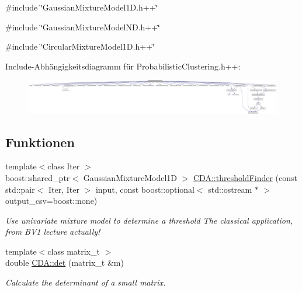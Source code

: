{\ttfamily \#include \char`\"{}GaussianMixtureModel1D.h++\char`\"{}}\par
{\ttfamily \#include \char`\"{}GaussianMixtureModelND.h++\char`\"{}}\par
{\ttfamily \#include \char`\"{}CircularMixtureModel1D.h++\char`\"{}}\par
Include-\/Abhängigkeitsdiagramm für ProbabilisticClustering.h++:\nopagebreak
\begin{figure}[H]
\begin{center}
\leavevmode
\includegraphics[width=420pt]{ProbabilisticClustering_8h_09_09__incl}
\end{center}
\end{figure}
\subsection*{Funktionen}
\begin{DoxyCompactItemize}
\item 
\hypertarget{namespaceCDA_a9e95468a6824e9e9ad95d61d47105664}{
{\footnotesize template$<$class Iter $>$ }\\boost::shared\_\-ptr$<$ GaussianMixtureModel1D $>$ \hyperlink{namespaceCDA_a9e95468a6824e9e9ad95d61d47105664}{CDA::thresholdFinder} (const std::pair$<$ Iter, Iter $>$ input, const boost::optional$<$ std::ostream $\ast$ $>$ output\_\-csv=boost::none)}
\label{namespaceCDA_a9e95468a6824e9e9ad95d61d47105664}

\begin{DoxyCompactList}\small\item\em Use univariate mixture model to determine a threshold The classical application, from BV1 lecture actually! \item\end{DoxyCompactList}\item 
\hypertarget{namespaceCDA_a5ef8a67c215c1b5d7b23192c5336b536}{
{\footnotesize template$<$class matrix\_\-t $>$ }\\double \hyperlink{namespaceCDA_a5ef8a67c215c1b5d7b23192c5336b536}{CDA::det} (matrix\_\-t \&m)}
\label{namespaceCDA_a5ef8a67c215c1b5d7b23192c5336b536}

\begin{DoxyCompactList}\small\item\em Calculate the determinant of a small matrix. \item\end{DoxyCompactList}\end{DoxyCompactItemize}


